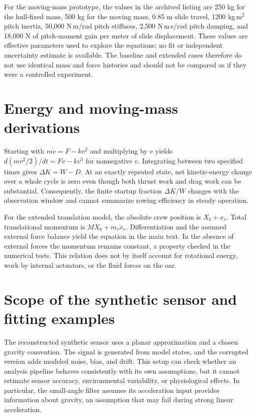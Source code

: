 \documentclass[11pt]{article}
\begin{document}
For the moving-mass prototype, the values in the archived listing are 250 kg for the hull-fixed mass, 500 kg for the moving mass, 0.85 m slide travel, 1200 kg\,m$^2$ pitch inertia, 50,000 N\,m/rad pitch stiffness, 2,500 N\,m\,s/rad pitch damping, and 18,000 N of pitch-moment gain per meter of slide displacement. These values are effective parameters used to explore the equations; no fit or independent uncertainty estimate is available. The baseline and extended cases therefore do not use identical mass and force histories and should not be compared as if they were a controlled experiment.

\section{Energy and moving-mass derivations}
Starting with $m\dot v=F-kv^2$ and multiplying by $v$ yields $d(mv^2/2)/dt=Fv-kv^3$ for nonnegative $v$. Integrating between two specified times gives $\Delta K=W-D$. At an exactly repeated state, net kinetic-energy change over a whole cycle is zero even though both thrust work and drag work can be substantial. Consequently, the finite startup fraction $\Delta K/W$ changes with the observation window and cannot summarize rowing efficiency in steady operation.

For the extended translation model, the absolute crew position is $X_b+x_r$. Total translational momentum is $M\dot X_b+m_r\dot x_r$. Differentiation and the assumed external force balance yield the equation in the main text. In the absence of external forces the momentum remains constant, a property checked in the numerical tests. This relation does not by itself account for rotational energy, work by internal actuators, or the fluid forces on the oar.

\section{Scope of the synthetic sensor and fitting examples}
The reconstructed synthetic sensor uses a planar approximation and a chosen gravity convention. The signal is generated from model states, and the corrupted version adds modeled noise, bias, and drift. This setup can check whether an analysis pipeline behaves consistently with its own assumptions, but it cannot estimate sensor accuracy, environmental variability, or physiological effects. In particular, the small-angle filter assumes its acceleration input provides information about gravity, an assumption that may fail during strong linear acceleration.
\end{document}
